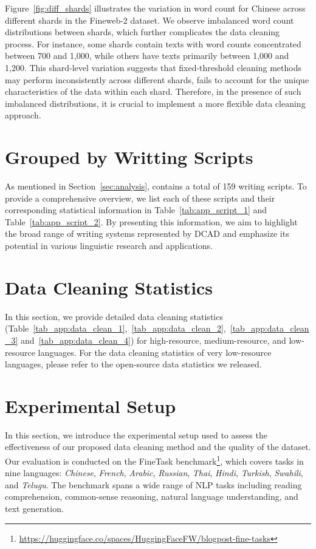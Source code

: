 Figure~\ref{fig:diff_shards} illustrates the variation in word count for Chinese across different shards in the Fineweb-2 dataset.
We observe imbalanced word count distributions between shards, which further complicates the data cleaning process.
For instance, some shards contain texts with word counts concentrated between 700 and 1,000, while others have texts primarily between 1,000 and 1,200.
This shard-level variation suggests that fixed-threshold cleaning methods may perform inconsistently across different shards, fails to account for the unique characteristics of the data within each shard.
Therefore, in the presence of such imbalanced distributions, it is crucial to implement a more flexible data cleaning approach.

\section{\dcad Grouped by Writting Scripts}
\label{app:script}
As mentioned in Section~\ref{sec:analysis}, \dcad contains a total of 159 writing scripts.
To provide a comprehensive overview, we list each of these scripts and their corresponding statistical information in Table~\ref{tab:app_script_1} and Table~\ref{tab:app_script_2}.
By presenting this information, we aim to highlight the broad range of writing systems represented by DCAD and emphasize its potential in various linguistic research and applications.

\section{Data Cleaning Statistics}
\label{app:data_clean_statistic}
In this section, we provide detailed data cleaning statistics (Table~\ref{tab_app:data_clean_1},~\ref{tab_app:data_clean_2},~\ref{tab_app:data_clean_3} and~\ref{tab_app:data_clean_4}) for high-resource, medium-resource, and low-resource languages. For the data cleaning statistics of very low-resource languages, please refer to the open-source data statistics we released.

\section{Experimental Setup}
\label{app:exp_setup}
In this section, we introduce the experimental setup used to assess the effectiveness of our proposed data cleaning method and the quality of the \dcad dataset.
Our evaluation is conducted on the FineTask benchmark\footnote{\url{https://huggingface.co/spaces/HuggingFaceFW/blogpost-fine-tasks}}, which covers tasks in nine languages: \textit{Chinese}, \textit{French}, \textit{Arabic}, \textit{Russian}, \textit{Thai}, \textit{Hindi}, \textit{Turkish}, \textit{Swahili}, and \textit{Telugu}.
The benchmark spans a wide range of NLP tasks including reading comprehension, common-sense reasoning, natural language understanding, and text generation.

